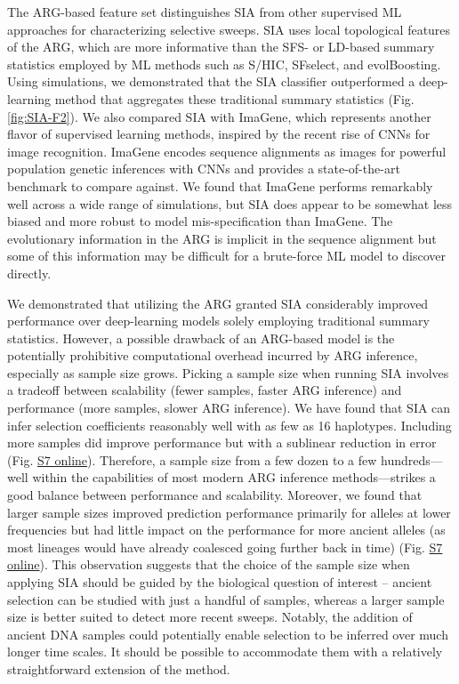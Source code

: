 The \ac{ARG}-based feature set distinguishes \ac{SIA} from other supervised \ac{ML} approaches for characterizing selective sweeps. \ac{SIA} uses local topological features of the \ac{ARG}, which are more informative than the \ac{SFS}- or \acs{LD}-based summary statistics employed by \ac{ML} methods such as S/HIC, SFselect, and evolBoosting. Using simulations, we demonstrated that the \ac{SIA} classifier outperformed a deep-learning method that aggregates these traditional summary statistics (Fig. \ref{fig:SIA-F2}). We also compared \ac{SIA} with ImaGene, which represents another flavor of supervised learning methods, inspired by the recent rise of \acp{CNN} for image recognition. ImaGene encodes sequence alignments as images for powerful population genetic inferences with \acp{CNN} and provides a state-of-the-art benchmark to compare against. We found that ImaGene performs remarkably well across a wide range of simulations, but \ac{SIA} does appear to be somewhat less biased and more robust to model mis-specification than ImaGene. The evolutionary information in the \ac{ARG} is implicit in the sequence alignment but some of this information may be difficult for a brute-force \ac{ML} model to discover directly.

We demonstrated that utilizing the \ac{ARG} granted \ac{SIA} considerably improved performance over deep-learning models solely employing traditional summary statistics. However, a possible drawback of an \ac{ARG}-based model is the potentially prohibitive computational overhead incurred by \ac{ARG} inference, especially as sample size grows. Picking a sample size when running \ac{SIA} involves a tradeoff between scalability (fewer samples, faster \ac{ARG} inference) and performance (more samples, slower \ac{ARG} inference). We have found that \ac{SIA} can infer selection coefficients reasonably well with as few as 16 haplotypes. Including more samples did improve performance but with a sublinear reduction in error (Fig. \href{https://academic.oup.com/mbe/article/39/1/msab332/6433161?login=true#supplementary-data}{S7 online}). Therefore, a sample size from a few dozen to a few hundreds—well within the capabilities of most modern \ac{ARG} inference methods—strikes a good balance between performance and scalability. Moreover, we found that larger sample sizes improved prediction performance primarily for alleles at lower frequencies but had little impact on the performance for more ancient alleles (as most lineages would have already coalesced going further back in time) (Fig. \href{https://academic.oup.com/mbe/article/39/1/msab332/6433161?login=true#supplementary-data}{S7 online}). This observation suggests that the choice of the sample size when applying \ac{SIA} should be guided by the biological question of interest -- ancient selection can be studied with just a handful of samples, whereas a larger sample size is better suited to detect more recent sweeps. Notably, the addition of ancient DNA samples could potentially enable selection to be inferred over much longer time scales. It should be possible to accommodate them with a relatively straightforward extension of the method.

